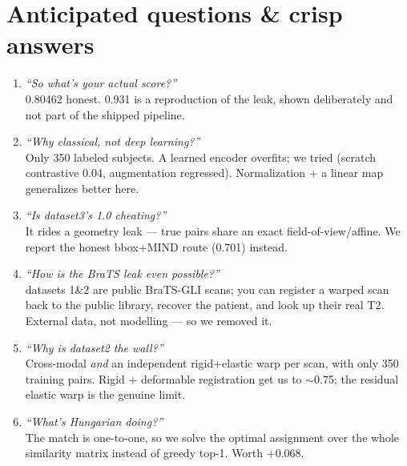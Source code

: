 \documentclass[12pt,a4paper]{article}
\begin{document}
\section{Anticipated questions \& crisp answers}
\newcommand{\qa}[2]{\item \textit{#1}\\[1pt] #2}
\begin{enumerate}[leftmargin=1.6em]
\qa{``So what's your actual score?''}{0.80462 honest. 0.931 is a reproduction of the leak,
shown deliberately and not part of the shipped pipeline.}
\qa{``Why classical, not deep learning?''}{Only 350 labeled subjects. A learned encoder
overfits; we tried (scratch contrastive 0.04, augmentation regressed). Normalization +
a linear map generalizes better here.}
\qa{``Is dataset3's 1.0 cheating?''}{It rides a geometry leak — true pairs share an exact
field-of-view/affine. We report the honest bbox+MIND route (0.701) instead.}
\qa{``How is the BraTS leak even possible?''}{datasets 1\&2 are public BraTS-GLI scans;
you can register a warped scan back to the public library, recover the patient, and look
up their real T2. External data, not modelling — so we removed it.}
\qa{``Why is dataset2 the wall?''}{Cross-modal \emph{and} an independent rigid+elastic warp
per scan, with only 350 training pairs. Rigid + deformable registration get us to $\sim$0.75;
the residual elastic warp is the genuine limit.}
\qa{``What's Hungarian doing?''}{The match is one-to-one, so we solve the optimal assignment
over the whole similarity matrix instead of greedy top-1. Worth +0.068.}
\end{enumerate}

\end{document}
